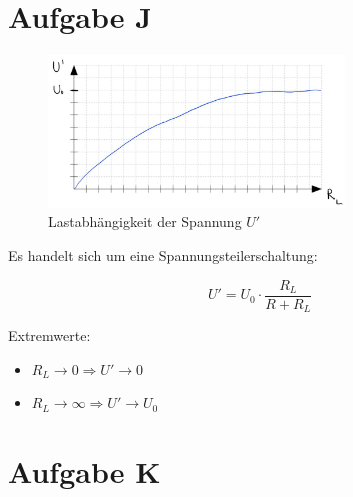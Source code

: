 \section*{Aufgabe J}

\begin{figure}[H]
    \centering
    \includegraphics[width=0.7\textwidth]{figs/Voraufgaben/J.jpg}
    \caption{Lastabhängigkeit der Spannung $U'$}
    \label{fig:VA_J}
\end{figure}

Es handelt sich um eine Spannungsteilerschaltung:

\[
U' = U_0 \cdot \frac{R_L}{R + R_L}
\]

Extremwerte:

\begin{itemize}
    \item $R_L \rightarrow 0 \Rightarrow U' \rightarrow 0$
    \item $R_L \rightarrow \infty \Rightarrow U' \rightarrow U_0$
\end{itemize}


\section*{Aufgabe K}